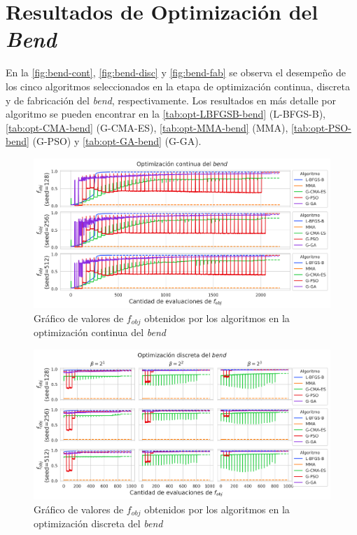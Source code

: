 \section{Resultados de Optimización del \emph{Bend}}\label{sec:results-bend}

En la \autoref{fig:bend-cont}, \autoref{fig:bend-disc} y \autoref{fig:bend-fab} se observa 
el desempeño de los cinco algoritmos seleccionados en la etapa de optimización continua, discreta y
de fabricación del \emph{bend}, respectivamente.
Los resultados en más detalle por algoritmo se pueden encontrar en la 
\autoref{tab:opt-LBFGSB-bend} (L-BFGS-B),
\autoref{tab:opt-CMA-bend} (G-CMA-ES),
\autoref{tab:opt-MMA-bend} (MMA),
\autoref{tab:opt-PSO-bend} (G-PSO) y
\autoref{tab:opt-GA-bend} (G-GA).

\begin{landscape}
\begin{figure}[ht]
  \centering
  \includegraphics[scale=1.0]{image/results/bend/bend-opt-cont.png}
  \caption{Gráfico de valores de $f_{obj}$ obtenidos por los algoritmos en la optimización continua del \emph{bend}}
  \label{fig:bend-cont}
\end{figure}
\end{landscape}

\begin{landscape}
\begin{figure}[ht]
  \centering
  \includegraphics[scale=1.0]{image/results/bend/bend-opt-disc.png}
  \caption{Gráfico de valores de $f_{obj}$ obtenidos por los algoritmos en la optimización discreta del \emph{bend}}
  \label{fig:bend-disc}
\end{figure}
\end{landscape}

